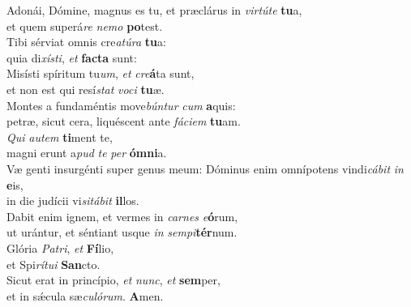 \evenverse Adonái, Dómine, magnus es tu, et præclárus in \textit{vir}\textit{tú}\textit{te} \textbf{tu}a,~\*\\
\evenverse et quem superá\textit{re} \textit{ne}\textit{mo} \textbf{po}test.\\
\oddverse Tibi sérviat omnis cre\textit{a}\textit{tú}\textit{ra} \textbf{tu}a:~\*\\
\oddverse quia di\textit{xí}\textit{sti}, \textit{et} \textbf{fa}\textbf{cta} sunt:\\
\evenverse Misísti spíritum tu\textit{um}, \textit{et} \textit{cre}\textbf{á}ta sunt,~\*\\
\evenverse et non est qui resí\textit{stat} \textit{vo}\textit{ci} \textbf{tu}æ.\\
\oddverse Montes a fundaméntis move\textit{bún}\textit{tur} \textit{cum} \textbf{a}quis:~\*\\
\oddverse petræ, sicut cera, liquéscent ante \textit{fá}\textit{ci}\textit{em} \textbf{tu}am.\\
\evenverse \textit{Qui} \textit{au}\textit{tem} \textbf{ti}ment te,~\*\\
\evenverse magni erunt a\textit{pud} \textit{te} \textit{per} \textbf{óm}\textbf{ni}a.\\
\oddverse Væ genti insurgénti super genus meum: Dóminus enim omnípotens vindi\textit{cá}\textit{bit} \textit{in} \textbf{e}is,~\*\\
\oddverse in die judícii vi\textit{si}\textit{tá}\textit{bit} \textbf{il}los.\\
\evenverse Dabit enim ignem, et vermes in \textit{car}\textit{nes} \textit{e}\textbf{ó}rum,~\*\\
\evenverse ut urántur, et séntiant usque \textit{in} \textit{sem}\textit{pi}\textbf{tér}num.\\
\oddverse Glória \textit{Pa}\textit{tri}, \textit{et} \textbf{Fí}lio,~\*\\
\oddverse et Spi\textit{rí}\textit{tu}\textit{i} \textbf{San}cto.\\
\evenverse Sicut erat in princípio, \textit{et} \textit{nunc}, \textit{et} \textbf{sem}per,~\*\\
\evenverse et in sǽcula sæ\textit{cu}\textit{ló}\textit{rum}. \textbf{A}men.\\
